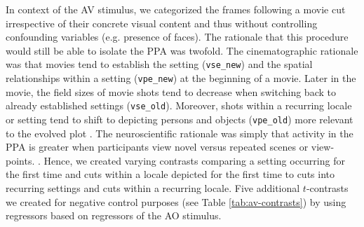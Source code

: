 \documentclass[english]{article}
\begin{document}

In context of the AV stimulus, we categorized the frames following a movie cut
irrespective of their concrete visual content and thus without controlling
confounding variables (e.g. presence of faces). The rationale that this
procedure would still be able to isolate the PPA was twofold.
The cinematographic rationale was that movies tend to establish the setting
(\texttt{vse\_new}) and the spatial relationships within a setting
(\texttt{vpe\_new}) at the beginning of a movie.
Later in the movie, the field sizes of movie shots tend to decrease when
switching back to already established settings (\texttt{vse\_old}).
Moreover, shots within a recurring locale or setting tend to shift to depicting
persons and objects (\texttt{vpe\_old}) more relevant to the evolved plot
\citep{brown2012cinematography, mercado2011filmmakers}.
The neuroscientific rationale was simply that activity in the PPA is greater
when participants view novel versus repeated scenes or view-points.
\citep{epstein1999parahippocampal}.
Hence, we created varying contrasts comparing a setting occurring for the first
time and cuts within a locale depicted for the first time to cuts into recurring
settings and cuts within a recurring locale.
Five additional $t$-contrasts we created for negative control purposes
(see Table \ref{tab:av-contrasts}) by using regressors based on regressors of
the AO stimulus.
\end{document}
